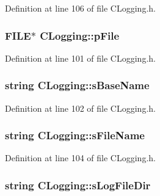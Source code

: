 \-Definition at line 106 of file \-C\-Logging.\-h.

\hypertarget{class_c_logging_a610bd219492305abbaab8d9e250ff5f8}{
\subsubsection[{p\-File}]{\setlength{\rightskip}{0pt plus 5cm}\-F\-I\-L\-E$\ast$ {\bf \-C\-Logging\-::p\-File}}}\label{class_c_logging_a610bd219492305abbaab8d9e250ff5f8}


\-Definition at line 101 of file \-C\-Logging.\-h.

\hypertarget{class_c_logging_ab910ec9b836bfa113942632969539b41}{
\subsubsection[{s\-Base\-Name}]{\setlength{\rightskip}{0pt plus 5cm}string {\bf \-C\-Logging\-::s\-Base\-Name}}}\label{class_c_logging_ab910ec9b836bfa113942632969539b41}


\-Definition at line 102 of file \-C\-Logging.\-h.

\hypertarget{class_c_logging_afac93962c6d3566015c5175ec002ed11}{
\subsubsection[{s\-File\-Name}]{\setlength{\rightskip}{0pt plus 5cm}string {\bf \-C\-Logging\-::s\-File\-Name}}}\label{class_c_logging_afac93962c6d3566015c5175ec002ed11}


\-Definition at line 104 of file \-C\-Logging.\-h.

\hypertarget{class_c_logging_a98be76d6204726bd5aae8cdf4cb744a0}{
\subsubsection[{s\-Log\-File\-Dir}]{\setlength{\rightskip}{0pt plus 5cm}string {\bf \-C\-Logging\-::s\-Log\-File\-Dir}}}\label{class_c_logging_a98be76d6204726bd5aae8cdf4cb744a0}


